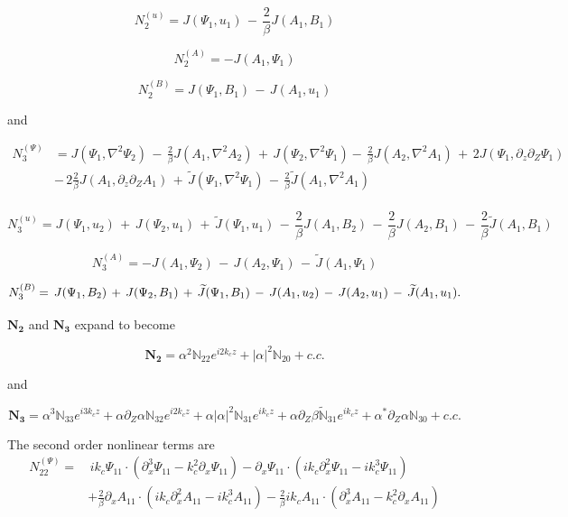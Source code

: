 \documentclass{emulateapj}
\newcommand{\beq}{\begin{equation}}
\newcommand{\eeq}{\end{equation}}
\begin{document}
\beq
N_2^{(u)} = J(\Psi_1, u_1) \, - \, \frac{2}{\beta} J(A_1, B_1) 
\eeq

\beq
N_2^{(A)} = - J(A_1, \Psi_1) 
\eeq

\beq
N_2^{(B)} =  J(\Psi_1, B_1) \, - \, J(A_1, u_1)
\eeq

and

\beq
\begin{split}
N_3^{(\Psi)} & = J(\Psi_1, \nabla^2\Psi_2) \, - \, \frac{2}{\beta}J(A_1, \nabla^2 A_2) \,+\, J(\Psi_2, \nabla^2\Psi_1) - \, \frac{2}{\beta}J(A_2, \nabla^2 A_1) \,+\, 2 J(\Psi_1, \partial_z\partial_Z \Psi_1) \, \\
& - \, 2 \frac{2}{\beta}J(A_1, \partial_z\partial_Z A_1) \,+\, \widetilde{J}(\Psi_1, \nabla^2 \Psi_1) \, - \,  \frac{2}{\beta}\widetilde{J}(A_1, \nabla^2 A_1)\\
\end{split}
\eeq

\beq
N_3^{(u)} = J(\Psi_1, u_2) \, + \, J(\Psi_2, u_1) \, + \, \widetilde{J}(\Psi_1, u_1) \, - \, \frac{2}{\beta} J(A_1, B_2) \, - \, \frac{2}{\beta} J(A_2, B_1) \, - \, \frac{2}{\beta} \widetilde{J}(A_1, B_1)
\eeq

\beq
N_3^{(A)} = - J(A_1, \Psi_2) \, - \, J(A_2, \Psi_1) \, - \, \widetilde{J}(A_1, \Psi_1)
\eeq

\beq
N_3^{(B)} = \, J(\Psi_1, B_2) \, + \, J(\Psi_2, B_1) \, + \, \widetilde{J}(\Psi_1, B_1) \, - \, J(A_1, u_2) \, - \,  J(A_2, u_1) \, - \, \widetilde{J}(A_1, u_1).\\
\eeq

$\mathbf{N_2}$ and $\mathbf{N_3}$ expand to become

\beq
\mathbf{N_2} = \alpha^2\mathbb{N}_{22} e^{i2 k_c z} + \left|\alpha\right|^2 \mathbb{N}_{20} + c.c.
\eeq

and

\beq
\mathbf{N_3} = \alpha^3 \mathbb{N}_{33} e^{i 3 k_c z} + \alpha\partial_Z\alpha \mathbb{N}_{32} e^{i 2 k_c z} + \alpha\left|\alpha\right|^2 \mathbb{N}_{31} e^{i k_c z} + \alpha \partial_Z  \beta \mathbb{\widetilde{N}}_{31} e^{i k_c z} + \alpha^*\partial_Z \alpha \mathbb{N}_{30} + c.c.
\eeq

The second order nonlinear terms are \\

\beq
\begin{split}
N_{22}^{(\Psi)} = & \, i k_c \Psi_{11} \cdot \left(\partial_x^3 \Psi_{11} - k_c^2 \partial_x \Psi_{11}\right) - \partial_x \Psi_{11} \cdot \left(i k_c \partial_x^2 \Psi_{11} - i k_c^3 \Psi_{11}\right) \\
& + \frac{2}{\beta}\partial_x A_{11} \cdot \left(i k_c \partial_x^2 A_{11} - i k_c^3 A_{11}\right) - \frac{2}{\beta} i k_c A_{11} \cdot \left(\partial_x^3 A_{11} - k_c^2 \partial_x A_{11}\right)
\end{split}
\eeq
\end{document}

